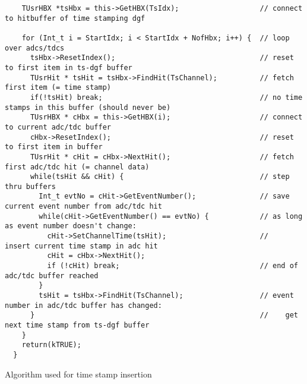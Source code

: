 \documentclass[10pt]{article}
\newenvironment{yellowboxed}
	{\begin{Sbox}\begin{minipage}[t]}
	{\end{minipage}\end{Sbox}\colorbox{yellow}{\TheSbox}}
\begin{document}
\begin{center}
\begin{table}[H]
{\begin{yellowboxed}{\linewidth}
\verb+    TUsrHBX *tsHbx = this->GetHBX(TsIdx);                   // connect to hitbuffer of time stamping dgf+\\
\verb+  +\\
\verb-    for (Int_t i = StartIdx; i < StartIdx + NofHbx; i++) {  // loop over adcs/tdcs-\\
\verb+      tsHbx->ResetIndex();                                  // reset to first item in ts-dgf buffer+\\
\verb+      TUsrHit * tsHit = tsHbx->FindHit(TsChannel);          // fetch first item (= time stamp)+\\
\verb+      if(!tsHit) break;                                     // no time stamps in this buffer (should never be)+\\
\verb+      TUsrHBX * cHbx = this->GetHBX(i);                     // connect to current adc/tdc buffer+\\
\verb+      cHbx->ResetIndex();                                   // reset to first item in buffer+\\
\verb+      TUsrHit * cHit = cHbx->NextHit();                     // fetch first adc/tdc hit (= channel data)+\\
\verb+      while(tsHit && cHit) {                                // step thru buffers+\\
\verb+        Int_t evtNo = cHit->GetEventNumber();               // save current event number from adc/tdc hit+\\
\verb+        while(cHit->GetEventNumber() == evtNo) {            // as long as event number doesn't change:+\\
\verb+          cHit->SetChannelTime(tsHit);                      //    insert current time stamp in adc hit+\\
\verb+          cHit = cHbx->NextHit();+\\
\verb+          if (!cHit) break;                                 // end of adc/tdc buffer reached+\\
\verb+        }+\\
\verb+        tsHit = tsHbx->FindHit(TsChannel);                  // event number in adc/tdc buffer has changed:+\\
\verb+      }                                                     //    get next time stamp from ts-dgf buffer+\\
\verb+    }+\\
\verb+    return(kTRUE);+\\
\verb+  }+
\end{yellowboxed}}
\caption{Algorithm used for time stamp insertion}
\label{TabTsiAlgorithm}
\end{table}
\end{center}
\end{document}
